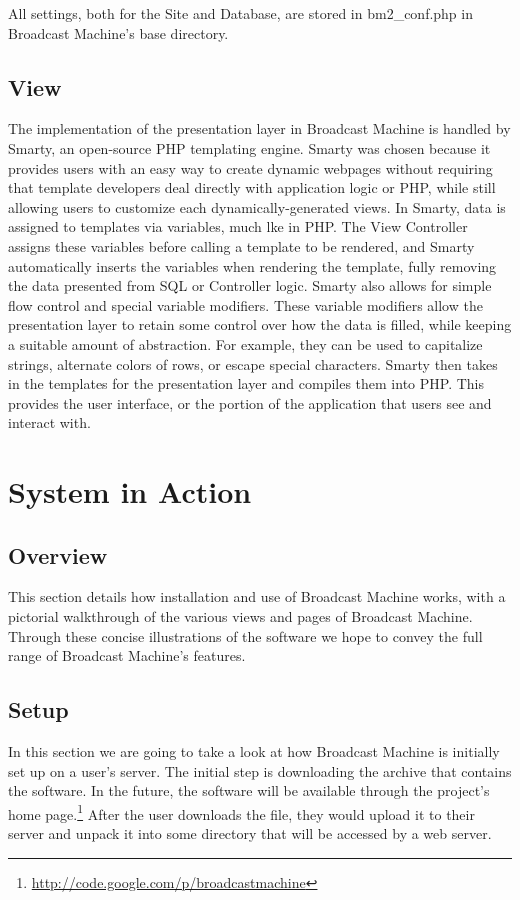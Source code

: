 \documentclass[a4paper,12pt]{report}
\begin{document}
All settings, both for the Site and Database, are stored in bm2\_conf.php in Broadcast Machine's base directory.

\section{View}
The implementation of the presentation layer in Broadcast Machine is handled by Smarty, an open-source PHP templating engine. 
Smarty was chosen because it provides users with an easy way to create dynamic webpages without requiring that template developers deal directly with application logic or PHP, while still allowing users to customize each dynamically-generated views. In Smarty, data is assigned to templates via variables, much lke in PHP. The View Controller assigns these variables before calling a template to be rendered, and Smarty automatically inserts the variables when rendering the template, fully removing the data presented from SQL or Controller logic.
Smarty also allows for simple flow control and special variable modifiers.
These variable modifiers allow the presentation layer to retain some control over how the data is filled, while keeping a suitable amount of abstraction.
For example, they can be used to capitalize strings, alternate colors of rows, or escape special characters.
Smarty then takes in the templates for the presentation layer and compiles them into PHP. This provides the user interface, or the portion of the application that users see and interact with.

\chapter{System in Action}
\section{Overview}
This section details how installation and use of Broadcast Machine works, with a pictorial walkthrough of the various views and pages of Broadcast Machine. 
Through these concise illustrations of the software we hope to convey the full range of Broadcast Machine's features.

\section{Setup}
In this section we are going to take a look at how Broadcast Machine is initially set up on a user's server.
The initial step is downloading the archive that contains the software.
In the future, the software will be available through the project's home page.\footnote{\url{http://code.google.com/p/broadcastmachine}}
After the user downloads the file, they would upload it to their server and unpack it into some directory that will be accessed by a web server.
\end{document}
